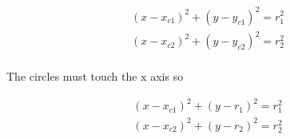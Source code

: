 \documentclass[fleqn]{article}
\begin{document}
\begin{equation}
\begin{alignedat}{2}
  (x-x_{c1})^2 + (y-y_{c1})^2 = r_1^2 \\
    (x-x_{c2})^2 + (y-y_{c2})^2 = r_2^2 \\
 \end{alignedat}
\end{equation}

The circles must touch the x axis so


\begin{equation}
\begin{alignedat}{2}
  (x-x_{c1})^2 + (y-r_1)^2 = r_1^2 \\
    (x-x_{c2})^2 + (y-r_2)^2 = r_2^2 \\
 \end{alignedat}
\end{equation}
\end{document}
